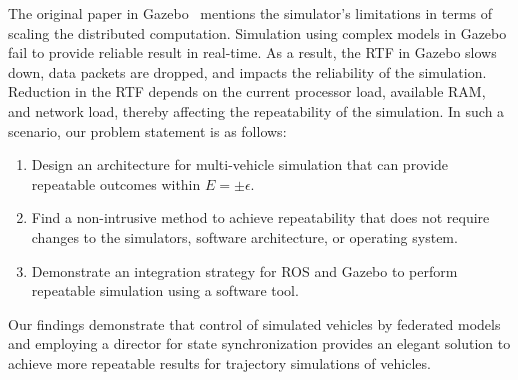 \documentclass[aps,pra,twocolumn,notitlepage,nofootinbib,superscriptaddress]{revtex4-1}
\begin{document}
The original paper in Gazebo~\cite{koenig2004design} mentions the simulator's limitations in terms of scaling the distributed computation. Simulation using complex models in Gazebo fail to provide reliable result in real-time. As a result, the RTF in Gazebo slows down, data packets are dropped, and impacts the reliability of the simulation. Reduction in the RTF depends on the current processor load, available RAM, and network load, thereby affecting the repeatability of the simulation. In such a scenario, our problem statement is as follows:

\begin{enumerate}
\item Design an architecture for multi-vehicle simulation that can provide repeatable outcomes within $E = \pm \epsilon$.
\item Find a non-intrusive method to achieve repeatability that does not require changes to the simulators, software architecture, or operating system.
\item Demonstrate an integration strategy for ROS and Gazebo to perform repeatable simulation using a software tool.

\end{enumerate}
Our findings demonstrate that control of simulated vehicles by federated models and employing a director for state synchronization provides an elegant solution to achieve more repeatable results for trajectory simulations of vehicles.

\end{document}
